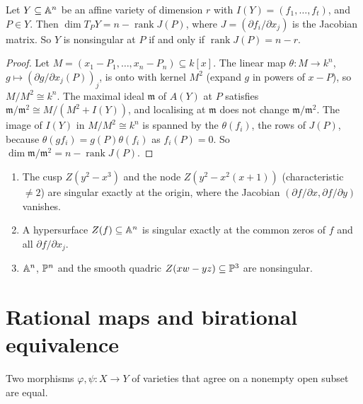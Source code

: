 \begin{theorem}\label{varieties:theorem-jacobian}
Let $Y \subseteq \mathbb{A}^n$ be an affine variety of dimension $r$ with $I(Y) = (f_1, \ldots, f_t)$, and $P \in Y$. Then
$\dim T_PY = n - \operatorname{rank}J(P)$, where $J = (\partial f_i/\partial x_j)$ is the Jacobian matrix. So $Y$ is nonsingular at $P$ if and only
if $\operatorname{rank}J(P) = n - r$.
\end{theorem}

\begin{proof}
Let $M = (x_1 - P_1, \ldots, x_n - P_n) \subseteq k[x]$. The linear map $\theta \colon M \to k^n$, $g \mapsto (\partial g/\partial x_j(P))_j$, is onto with
kernel $M^2$ (expand $g$ in powers of $x - P$), so $M/M^2 \cong k^n$. The maximal ideal $\mathfrak{m}$ of $A(Y)$ at $P$ satisfies
$\mathfrak{m}/\mathfrak{m}^2 \cong M/(M^2 + I(Y))$, and localising at $\mathfrak{m}$ does not change $\mathfrak{m}/\mathfrak{m}^2$. The image of $I(Y)$ in
$M/M^2 \cong k^n$ is spanned by the $\theta(f_i)$, the rows of $J(P)$, because $\theta(gf_i) = g(P)\theta(f_i)$ as $f_i(P) = 0$. So
$\dim\mathfrak{m}/\mathfrak{m}^2 = n - \operatorname{rank}J(P)$.
\end{proof}

\begin{example}\label{varieties:example-singular}
\begin{enumerate}
\item The cusp $Z(y^2 - x^3)$ and the node $Z(y^2 - x^2(x + 1))$ (characteristic $\neq 2$) are singular exactly at the origin, where the
Jacobian $(\partial f/\partial x, \partial f/\partial y)$ vanishes.
\item A hypersurface $Z(f) \subseteq \mathbb{A}^n$ is singular exactly at the common zeros of $f$ and all $\partial f/\partial x_j$.
\item $\mathbb{A}^n$, $\mathbb{P}^n$ and the smooth quadric $Z(xw - yz) \subseteq \mathbb{P}^3$ are nonsingular.
\end{enumerate}
\end{example}

\section{Rational maps and birational equivalence}\label{varieties:section-rational-maps}

\begin{lemma}\label{varieties:lemma-morphisms-agree}
Two morphisms $\varphi, \psi \colon X \to Y$ of varieties that agree on a nonempty open subset are equal.
\end{lemma}

